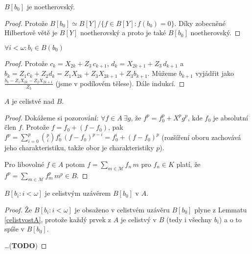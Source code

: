 \documentclass[11pt,a4paper]{article}
\newcommand\p[1]{\mathcal{ #1 }} %
\theoremstyle{definition}
\theoremstyle{plain}
\begin{document}
\veta $B[b_0]$ je noetherovský.
\begin{proof}
	 Protože $B[b_0] \simeq B[Y] / \{ f \in B[Y] : f(b_0) = 0 \}$. Díky
	 zobecněné Hilbertově větě je $B[Y]$ noetherovský a proto je také $B[b_0]$
	 noetherovský.
\end{proof}

\lemma $\forall i < \omega\colon b_i \in B(b_0)$
\begin{proof}
	Protože $c_k = X_{2k} + Z_3\,c_{k+1}$, $d_k = X_{2k+1} + Z_3\,d_{k+1}$ a $b_k
	= Z_1 c_k + Z_2 d_k = Z_1 X_{2k} + Z_3 X_{2k + 1} + Z_3 b_{k + 1}$. Můžeme
	$b_{k+1}$ vyjádřit jako $\frac{b_k - Z_1 X_{2k} - Z_2 X_{2k+1}}{Z_3}$ (jsme
	v podílovém tělese). Dále indukcí.
\end{proof}

\lemma\label{celistvostA} $A$ je celistvé nad $B$.
\begin{proof}
	Dokážeme si pozorování: $\forall f \in A~\exists g$, že $f^p = f^p_0 + X^p
	g^p$, kde $f_0$ je absolutní člen $f$. Protože $f = f_0 + (f - f_0)$, pak
	$f^p = \sum_{i = 0}^p {p\choose i} f^i_0\,(f-f_0)^{p-i} = f^i_0 + (f-f_0)^p$
	(rozšíření oboru zachovává jeho charakteristiku, takže obor je
	charakteristiky $p$).

	Pro libovolné $f \in A$ potom $f = \sum_{m \in \p M} f_n\,m$ pro $f_n \in
	K$ platí, že $f^p = \sum_{m\in\p M} f^p_m\,m^p \in B$.
\end{proof}

\veta $B[b_i : i < \omega]$ je celistvým uzávěrem $B[b_0]$ v $A$.
\begin{proof}
	Že $B[b_i : i < \omega]$ je obsaženo v celistvém uzávěru $B[b_0]$ plyne z
	Lemmatu \ref{celistvostA}, protože každý prvek z $A$ je celistvý v $B$
	(tedy i všechny $b_i$) a o to spíše v $B[b_0]$.

	\dots (\textbf{TODO})
\end{proof}
\end{document}
